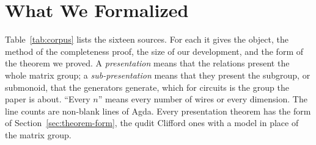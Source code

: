 \section{What We Formalized}\label{sec:corpus}

Table~\ref{tab:corpus} lists the sixteen sources. For each it gives the
object, the method of the completeness proof, the size of our
development, and the form of the theorem we proved. A
\emph{presentation} means that the relations present the whole matrix
group; a \emph{sub-presentation} means that they present the subgroup,
or submonoid, that the generators generate, which for circuits is the
group the paper is about. ``Every $n$'' means every number of wires or
every dimension. The line counts are non-blank lines of Agda. Every
presentation theorem has the form of Section~\ref{sec:theorem-form},
the qudit Clifford ones with a model in place of the matrix group.


